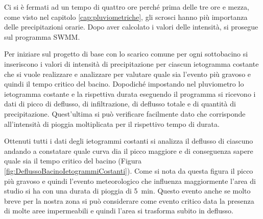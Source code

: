 Ci si è fermati ad un tempo di quattro ore perché prima delle tre ore e mezza, come visto nel capitolo \ref{cap:pluviometriche}, gli scrosci hanno più importanza delle precipitazioni orarie.
Dopo aver calcolato i valori delle intensità, si prosegue sul programma SWMM.

Per iniziare sul progetto di base con lo scarico comune per ogni sottobacino si inseriscono i valori di intensità di precipitazione per ciascun ietogramma costante che si vuole realizzare e analizzare per valutare quale sia l'evento più gravoso e quindi il tempo critico del bacino. 
Dopodiché impostando nel pluviometro lo ietogramma costante e la rispettiva durata eseguendo il programma si ricevono i dati di picco di deflusso, di infiltrazione, di deflusso totale e di quantità di precipitazione.
Quest'ultima si può verificare facilmente dato che corrisponde all'intensità di pioggia moltiplicata per il rispettivo tempo di durata.

Ottenuti tutti i dati degli ietogrammi costanti si analizza il deflusso di ciascuno andando a constatare quale curva dia il picco maggiore e di conseguenza sapere quale sia il tempo critico del bacino (Figura \ref{fig:DeflussoBacinoIetogrammiCostanti}). 
Come si nota da questa figura il picco più gravoso e quindi l'evento meteorologico che influenza maggiormente l'area di studio si ha con una durata di pioggia di \SI{5}{\minute}.
Questo evento anche se molto breve per la nostra zona si può considerare come evento critico data la presenza di molte aree impermeabili e quindi l'area si trasforma subito in deflusso.

